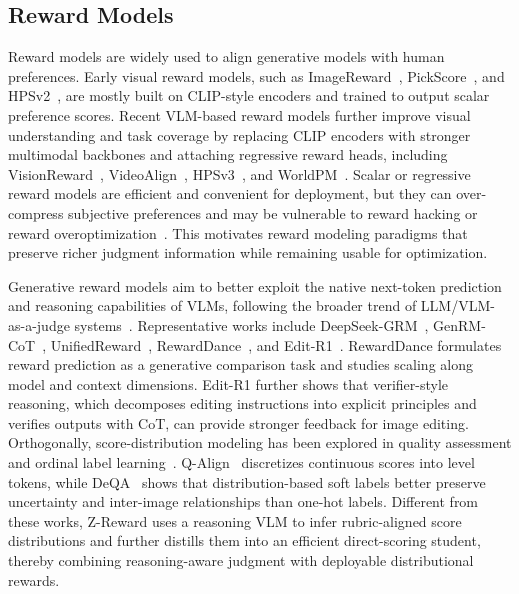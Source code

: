 \documentclass{article}
\newcommand{\mname}{Z-Reward\xspace}
\begin{document}
\subsection{Reward Models}

Reward models are widely used to align generative models with human preferences. Early visual reward models, such as ImageReward~\cite{xu2023imagereward}, PickScore~\cite{kirstain2023pickapicopendatasetuser}, and HPSv2~\cite{wu2023humanpreferencescorev2}, are mostly built on CLIP-style encoders and trained to output scalar preference scores. Recent VLM-based reward models further improve visual understanding and task coverage by replacing CLIP encoders with stronger multimodal backbones and attaching regressive reward heads, including VisionReward~\cite{xu2026visionrewardfinegrainedmultidimensionalhuman}, VideoAlign~\cite{liu2025improvingvideogenerationhuman}, HPSv3~\cite{ma2025hpsv3widespectrumhumanpreference}, and WorldPM~\cite{wang2025worldpmscalinghumanpreference}. Scalar or regressive reward models are efficient and convenient for deployment, but they can over-compress subjective preferences and may be vulnerable to reward hacking or reward overoptimization~\cite{you2025teachinglargelanguagemodels,wu2025rewarddancerewardscalingvisual,gao2023scaling,rafailov2024scaling}. This motivates reward modeling paradigms that preserve richer judgment information while remaining usable for optimization. %

Generative reward models aim to better exploit the native next-token prediction and reasoning capabilities of VLMs, following the broader trend of LLM/VLM-as-a-judge systems~\cite{zheng2023judging,gu2024surveyllmasajudge,chen2024mllmjudge,chen2024mjbench}. Representative works include DeepSeek-GRM~\cite{liu2025inferencetimescalinggeneralistreward}, GenRM-CoT~\cite{zhang2025generativeverifiersrewardmodeling}, UnifiedReward~\cite{wang2026unifiedrewardmodelmultimodal}, RewardDance~\cite{wu2025rewarddancerewardscalingvisual}, and Edit-R1~\cite{guo2026leveraging}. RewardDance formulates reward prediction as a generative comparison task and studies scaling along model and context dimensions. Edit-R1 further shows that verifier-style reasoning, which decomposes editing instructions into explicit principles and verifies outputs with CoT, can provide stronger feedback for image editing. Orthogonally, score-distribution modeling has been explored in quality assessment and ordinal label learning~\cite{murray2012ava,talebi2018nima,diaz2019soft,wen2023ordinal}. Q-Align~\cite{wu2023qalign} discretizes continuous scores into level tokens, while DeQA~\cite{you2025teachinglargelanguagemodels} shows that distribution-based soft labels better preserve uncertainty and inter-image relationships than one-hot labels. Different from these works, \mname uses a reasoning VLM to infer rubric-aligned score distributions and further distills them into an efficient direct-scoring student, thereby combining reasoning-aware judgment with deployable distributional rewards.
\end{document}
